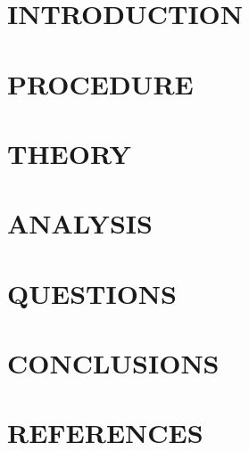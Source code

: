 \documentclass{article} %
\begin{document}
\newpage
\tableofcontents
\thispagestyle{plain} %
\thispagestyle{empty} %
\newpage

\setcounter{page}{1} %
\section{INTRODUCTION}

\section{PROCEDURE}

\section{THEORY}

\section{ANALYSIS}

\section{QUESTIONS}

\section{CONCLUSIONS}

\section{REFERENCES}

\newpage
\end{document}
